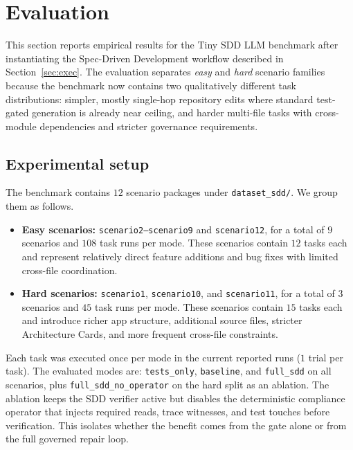 
\section{Evaluation}
\label{sec:evaluation}

This section reports empirical results for the Tiny SDD LLM benchmark after
instantiating the Spec-Driven Development workflow described in
Section~\ref{sec:exec}. The evaluation separates \emph{easy} and \emph{hard}
scenario families because the benchmark now contains two qualitatively different
task distributions: simpler, mostly single-hop repository edits where standard
test-gated generation is already near ceiling, and harder multi-file tasks with
cross-module dependencies and stricter governance requirements.

\subsection{Experimental setup}

The benchmark contains $12$ scenario packages under
\texttt{dataset\_sdd/}. We group them as follows.

\begin{itemize}[leftmargin=*]
\item \textbf{Easy scenarios:} \texttt{scenario2--scenario9} and
\texttt{scenario12}, for a total of $9$ scenarios and $108$ task runs per mode.
These scenarios contain $12$ tasks each and represent relatively direct feature
additions and bug fixes with limited cross-file coordination.
\item \textbf{Hard scenarios:} \texttt{scenario1}, \texttt{scenario10}, and
\texttt{scenario11}, for a total of $3$ scenarios and $45$ task runs per mode.
These scenarios contain $15$ tasks each and introduce richer app structure,
additional source files, stricter Architecture Cards, and more frequent
cross-file constraints.
\end{itemize}

Each task was executed once per mode in the current reported runs
($1$ trial per task). The evaluated modes are:
\texttt{tests\_only}, \texttt{baseline}, and \texttt{full\_sdd} on all
scenarios, plus \texttt{full\_sdd\_no\_operator} on the hard split as an
ablation. The ablation keeps the SDD verifier active but disables the
deterministic compliance operator that injects required reads, trace witnesses,
and test touches before verification. This isolates whether the benefit comes
from the gate alone or from the full governed repair loop.

